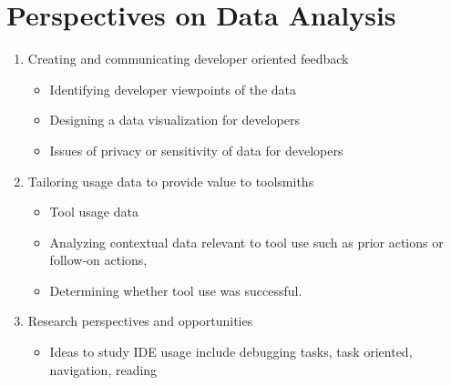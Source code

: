 \section{ Perspectives on Data Analysis}


\begin{enumerate}
\item Creating and communicating developer oriented feedback
\begin{itemize}
	\item
	Identifying developer viewpoints of the data
	\item
	Designing a data visualization for developers
	\item
	Issues of privacy or sensitivity of data for developers
\end{itemize}
\item Tailoring usage data to provide value to toolsmiths
\begin{itemize}
	\item 
	Tool usage data
	\item 
	Analyzing contextual data relevant to tool use such as prior actions or follow-on actions, 
	\item 
	Determining whether tool use was successful.
\end{itemize}
\item Research perspectives and opportunities
\begin{itemize}
	\item
	Ideas to study IDE usage include debugging tasks, task oriented, navigation, reading
\end{itemize}

\end{enumerate}
